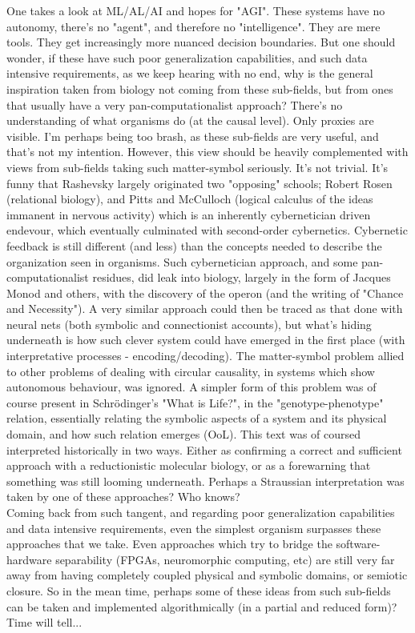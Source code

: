 \documentclass[a4paper,12pt,twoside,leqno]{article}
\begin{document}
One takes a look at ML/AL/AI and hopes for "AGI". These systems have no autonomy, there's no "agent", and therefore no "intelligence". They are mere tools. They get increasingly more nuanced decision boundaries. But one should wonder, if these have such poor generalization capabilities, and such data intensive requirements, as we keep hearing with no end, why is the general inspiration taken from biology not coming from these sub-fields, but from ones that usually have a very pan-computationalist approach? There's no understanding of what organisms do (at the causal level). Only proxies are visible. I'm perhaps being too brash, as these sub-fields are very useful, and that's not my intention. However, this view should be heavily complemented with views from sub-fields taking such matter-symbol seriously. It's not trivial. It's funny that Rashevsky largely originated two "opposing" schools; Robert Rosen (relational biology), and Pitts and McCulloch (logical calculus of the ideas immanent in nervous activity) which is an inherently cybernetician driven endevour, which eventually culminated with second-order cybernetics. Cybernetic feedback is still different (and less) than the concepts  needed to describe the organization seen in organisms. Such cybernetician approach, and some pan-computationalist residues, did leak into biology, largely in the form of Jacques Monod and others, with the discovery of the operon (and the writing of "Chance and Necessity"). A very similar approach could then be traced as that done with neural nets (both symbolic and connectionist accounts), but what's hiding underneath is how such clever system could have emerged in the first place (with interpretative processes - encoding/decoding). The matter-symbol problem allied to other problems of dealing with circular causality, in systems which show autonomous behaviour, was ignored. A simpler form of this problem was of course present in Schrödinger's "What is Life?", in the "genotype-phenotype" relation, essentially relating the symbolic aspects of a system and its physical domain, and how such relation emerges (OoL). This text was of coursed interpreted historically in two ways. Either as confirming a correct and sufficient approach with a reductionistic molecular biology, or as a forewarning that something was still looming underneath. Perhaps a Straussian interpretation was taken by one of these approaches? Who knows?\\
Coming back from such tangent, and regarding poor generalization capabilities and data intensive requirements, even the simplest organism surpasses these approaches that we take. Even approaches which try to bridge the software-hardware separability (FPGAs, neuromorphic computing, etc) are still very far away from having completely coupled physical and symbolic domains, or semiotic closure. So in the mean time, perhaps some of these ideas from such sub-fields can be taken and implemented algorithmically (in a partial and reduced form)? Time will tell...
\end{document}

